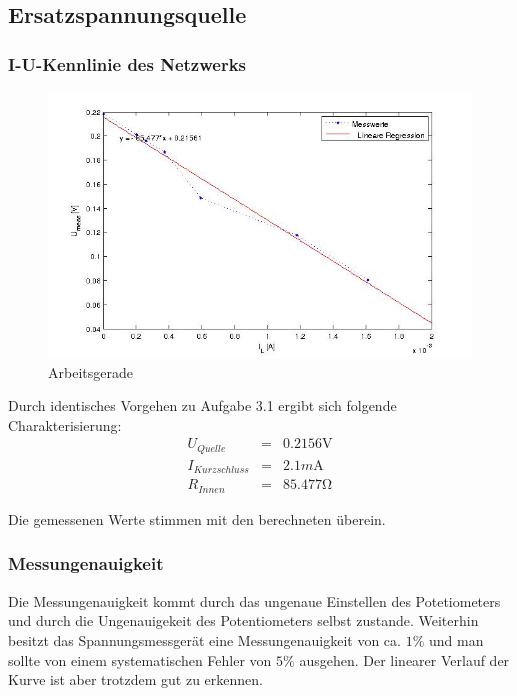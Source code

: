 \documentclass[10pt]{report}
\begin{document}
        \subsection{Ersatzspannungsquelle}
        \subsubsection{I-U-Kennlinie des Netzwerks}
        \begin{center}
            \begin{figure}[H]
              \includegraphics[width=\textwidth]{ErsatzspannungsQuelle.jpg}
              \caption{Arbeitsgerade}
            \end{figure}
        \end{center}

        Durch identisches Vorgehen zu Aufgabe 3.1 ergibt sich folgende
        Charakterisierung:
        \begin{eqnarray*}
            U_{Quelle} &=& 0.2156\si{\volt}\\
            I_{Kurzschluss} &=& 2.1\si{m\ampere}\\
            R_{Innen} &=& 85.477\si{\ohm}
        \end{eqnarray*}
		
		\vspace{0.5cm}
		
		Die gemessenen Werte stimmen mit den berechneten überein.


        \subsubsection{Messungenauigkeit}
        Die Messungenauigkeit kommt durch das ungenaue Einstellen des Potetiometers
        und durch die Ungenauigekeit des Potentiometers selbst zustande. Weiterhin besitzt
		das Spannungsmessgerät eine Messungenauigkeit von ca. $1\%$ und man sollte von einem
		systematischen Fehler von $5\%$ ausgehen. Der linearer Verlauf der Kurve ist aber 
		trotzdem gut zu erkennen.
\end{document}
